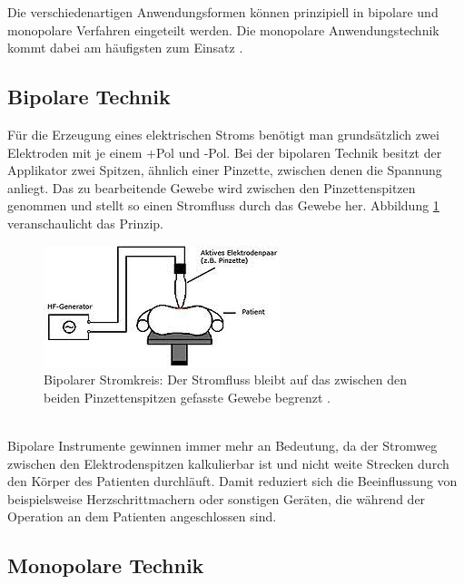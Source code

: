 \documentclass[letterpaper,12pt]{article}
\begin{document}
		Die verschiedenartigen Anwendungsformen können prinzipiell in bipolare und monopolare Verfahren eingeteilt werden. Die monopolare Anwendungstechnik kommt dabei am häufigsten zum Einsatz \cite{kramme2016medizintechnik}.
		
		\subsection{Bipolare Technik}
		
			Für die Erzeugung eines elektrischen Stroms benötigt man grundsätzlich zwei Elektroden mit je einem +Pol und -Pol. Bei der bipolaren Technik besitzt der Applikator zwei Spitzen, ähnlich einer Pinzette, zwischen denen die Spannung anliegt. Das zu bearbeitende Gewebe wird zwischen den Pinzettenspitzen genommen und stellt so einen Stromfluss durch das Gewebe her. Abbildung \ref{fig:bipolareTechnik2} veranschaulicht das Prinzip.
			\begin{figure}[ht] 
				\centering
				\includegraphics[width=0.35\columnwidth]{images/_bipolareTechnik.png}
				\caption{		 
					Bipolarer Stromkreis: Der Stromfluss bleibt auf das zwischen den beiden Pinzettenspitzen gefasste Gewebe begrenzt \cite{wiki:HF}.}
				\label{fig:bipolareTechnik2}
			\end{figure}\\
			Bipolare Instrumente gewinnen immer mehr an Bedeutung, da der Stromweg zwischen den Elektrodenspitzen kalkulierbar ist und nicht weite Strecken durch den Körper des Patienten durchläuft. Damit reduziert sich die Beeinflussung von beispielsweise Herzschrittmachern oder sonstigen Geräten, die während der Operation an dem Patienten angeschlossen sind.
		
		\subsection{Monopolare Technik}
		
\end{document}
